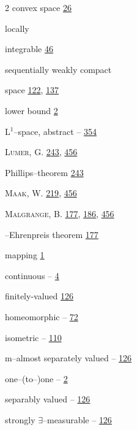 \begin{multicols}{2}
\hspace*{1.1em}convex space \hyperlink{page.26}{26}\par
\noindent locally\par
\hspace*{1.1em}integrable \hyperlink{page.46}{46}\par
\hspace*{1.1em}sequentially weakly compact\par
\hspace*{2.2em}space \hyperlink{page.122}{122}, \hyperlink{page.137}{137}\par
\noindent lower bound \hyperlink{page.2}{2}\par
\noindent L$^{1}$--space, abstract -- \hyperlink{page.354}{354}\par
\noindent \textsc{Lumer}, G. \hyperlink{page.243}{243}, \hyperlink{page.456}{456}\par
\hspace*{1.1em}Phillips--theorem \hyperlink{page.243}{243}\par
\noindent \textsc{Maak}, W. \hyperlink{page.219}{219}, \hyperlink{page.456}{456}\par
\noindent \textsc{Malgrange}, B. \hyperlink{page.177}{177}, \hyperlink{page.186}{186}, \hyperlink{page.456}{456}\par
\hspace*{1.1em}--Ehrenpreis theorem \hyperlink{page.177}{177}\par
\noindent mapping \hyperlink{page.1}{1}\par
\hspace*{1.1em}continuous -- \hyperlink{page.4}{4}\par
\hspace*{1.1em}finitely-valued \hyperlink{page.126}{126}\par
\hspace*{1.1em}homeomorphic -- \hyperlink{page.72}{72}\par
\hspace*{1.1em}isometric -- \hyperlink{page.110}{110}\par
\hspace*{1.1em}m--almost separately valued -- \hyperlink{page.126}{126}\par
\hspace*{1.1em}one--(to--)one -- \hyperlink{page.2}{2}\par
\hspace*{1.1em}separably valued -- \hyperlink{page.126}{126}\par
\hspace*{1.1em}strongly $\exists $--measurable -- \hyperlink{page.126}{126}\par

\end{multicols}
